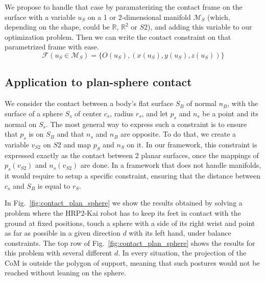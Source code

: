 

We propose to handle that case by paramaterizing the contact frame on the surface with a variable $u_S$ on a 1 or 2-dimensional manifold $\mathcal{M}_S$ (which, depending on the shape, could be $\mathbb{R}$, $\mathbb{R}^2$ or $S2$), and adding this variable to our optimization problem.
Then we can write the contact constraint on that parametrized frame with ease.
\begin{equation}
\label{eq:param_frame}
  \mathcal{F}(u_S\in \mathcal{M}_S) = \{O(u_S), (x(u_S), y(u_S), z(u_S))\}
\end{equation}


\subsection{Application to plan-sphere contact}
We consider the contact between a body's flat surface $S_B$ of normal $n_B$, with the surface of a sphere $S_s$ of center $c_s$, radius $r_s$, and let $p_s$ and $n_s$ be a point and its normal on $S_s$.
The most general way to express such a constraint is to ensure that $p_s$ is on $S_B$ and that $n_s$ and $n_B$ are opposite.
To do that, we create a variable $v_{S2}$ on $S2$ and map $p_S$ and $n_S$ on it.
In our framework, this constraint is expressed exactly as the contact between 2 planar surfaces, once the mappings of $p_s(v_{S2})$ and $n_s(v_{S2})$ are done.
In a framework that does not handle manifolds, it would require to setup a specific constraint, ensuring that the distance between $c_s$ and $S_B$ is equal to $r_S$.

In Fig.~\ref{fig:contact_plan_sphere} we show the results obtained by solving a problem where the HRP2-Kai robot has to keep its feet in contact with the ground at fixed positions, touch a sphere with a side of its right wrist and point as far as possible in a given direction $d$ with its left hand, under balance constraints.
The top row of Fig.~\ref{fig:contact_plan_sphere} shows the results for this problem with several different $d$.
In every situation, the projection of the CoM is outside the polygon of support, meaning that such postures would not be reached without leaning on the sphere.

